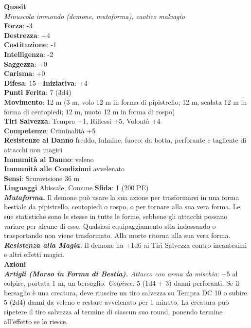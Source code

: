 \begin{multicols}{2}
\medskip\textbf{Quasit}\\
\emph{Minuscola immondo (demone, mutaforma), caotico malvagio}\\
\textbf{Forza}: -3\\
\textbf{Destrezza}: +4\\
\textbf{Costituzione}: -1\\
\textbf{Intelligenza}: -2\\
\textbf{Saggezza}: +0\\
\textbf{Carisma}: +0\\
\textbf{Difesa}: 15 - \textbf{Iniziativa}: +4\\
\textbf{Punti Ferita}: 7 (3d4)\\
\textbf{Movimento}: 12 m (3 m, volo 12 m in forma di pipistrello; 12 m,
scalata 12 m in forma di centopiedi; 12 m, nuoto 12 m in forma di rospo)\\
\textbf{Tiri Salvezza}: Tempra +1, Riflessi +5, Volontà +4\\
\textbf{Competenze}: Criminalità +5\\
\textbf{Resistenze al Danno} freddo, fulmine, fuoco; da botta, perforante e tagliente di attacchi non magici\\
\textbf{Immunità al Danno}: veleno\\
\textbf{Immunità alle Condizioni} avvelenato\\
\textbf{Sensi}: Scurovisione 36 m \\
\textbf{Linguaggi} Abissale, Comune 
\textbf{Sfida}: 1 (200 PE)\smallskip\\
\emph{\textbf{Mutaforma.}} Il demone può usare la sua azione per trasformarsi in una forma bestiale da pipistrello, centopiedi o rospo, o per tornare alla sua vera forma. Le sue statistiche sono le stesse in tutte le forme, sebbene gli attacchi possano variare per alcune di esse. Qualsiasi equipaggiamento stia indossando o trasportando non viene trasformato. Alla morte ritorna alla sua vera forma.\\
\emph{\textbf{Resistenza alla Magia.}} Il demone ha +1d6 ai Tiri Salvezza contro incantesimi e altri effetti magici.\\
\smallskip\textbf{Azioni}\\
\emph{\textbf{Artigli (Morso in Forma di Bestia).} Attacco con arma da mischia}: +5 al colpire, portata 1 m, un bersaglio. \emph{Colpisce:} 5 (1d4 + 3) danni perforanti. Se il bersaglio è una creatura, deve riuscire un tiro salvezza su Tempra DC 10 o subire 5 (2d4) danni da veleno e restare avvelenato per 1 minuto. La creatura può ripetere il tiro salvezza al termine di ciascun suo round, ponendo termine all'effetto se lo riesce.\\

\end{multicols}
